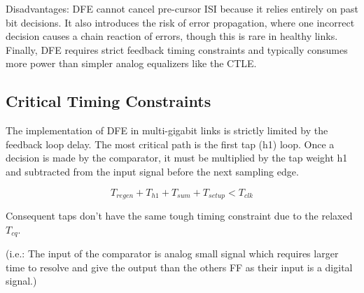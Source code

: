 Disadvantages:
DFE cannot cancel pre-cursor ISI because it relies entirely on past bit decisions. It also introduces the risk of error propagation, where one incorrect decision causes a chain reaction of errors, though this is rare in healthy links. Finally, DFE requires strict feedback timing constraints and typically consumes more power than simpler analog equalizers like the CTLE.

\subsection{Critical Timing Constraints}
The implementation of DFE in multi-gigabit links is strictly limited by the feedback loop delay. The most critical path is the first tap (h1) loop. Once a decision is made by the comparator, it must be multiplied by the tap weight h1 and subtracted from the input signal before the next sampling edge.

\begin{equation}
    T_{regen} + T_{h1} + T_{sum} + T_{setup} < T_{clk}
    \label{eq:dfe_timing_constraint}
\end{equation}

Consequent taps don't have the same tough timing constraint due to the relaxed $T_{cq}$.

(i.e.: The input of the comparator is analog small signal which requires larger time to resolve and give the output than the others FF as their input is a digital signal.)


